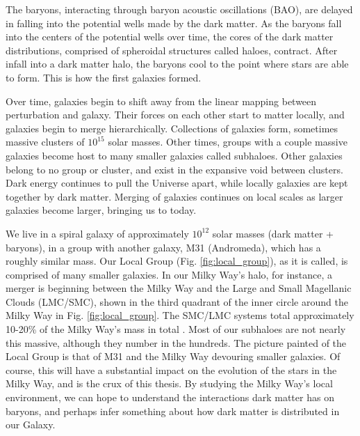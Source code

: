 The baryons, interacting through baryon acoustic oscillations (BAO), are delayed in falling into the potential wells made by the dark matter. As the baryons fall into the centers of the potential wells over time, the cores of the dark matter distributions, comprised of spheroidal structures called haloes, contract. After infall into a dark matter halo, the baryons cool to the point where stars are able to form. This is how the first galaxies formed. 

Over time, galaxies begin to shift away from the linear mapping between perturbation and galaxy. Their forces on each other start to matter locally, and galaxies begin to merge hierarchically. Collections of galaxies form, sometimes massive clusters of $10^{15}$ solar masses. Other times, groups with a couple massive galaxies become host to many smaller galaxies called subhaloes. Other galaxies belong to no group or cluster, and exist in the expansive void between clusters. Dark energy continues to pull the Universe apart, while locally galaxies are kept together by dark matter. Merging of galaxies continues on local scales as larger galaxies become larger, bringing us to today.

We live in a spiral galaxy of approximately $10^{12}$ solar masses (dark matter + baryons), in a group with another galaxy, M31 (Andromeda), which has a roughly similar mass. Our Local Group (Fig. \ref{fig:local_group}), as it is called, is comprised of many smaller galaxies. In our Milky Way's halo, for instance, a merger is beginning between the Milky Way and the Large and Small Magellanic Clouds (LMC/SMC), shown in the third quadrant of the inner circle around the Milky Way in Fig. \ref{fig:local_group}. The SMC/LMC systems total approximately 10-20\% of the Milky Way's mass in total \citep{erkal_lmc}. Most of our subhaloes are not nearly this massive, although they number in the hundreds. The picture painted of the Local Group is that of M31 and the Milky Way devouring smaller galaxies. Of course, this will have a substantial impact on the evolution of the stars in the Milky Way, and is the crux of this thesis. By studying the Milky Way's local environment, we can hope to understand the interactions dark matter has on baryons, and perhaps infer something about how dark matter is distributed in our Galaxy.



